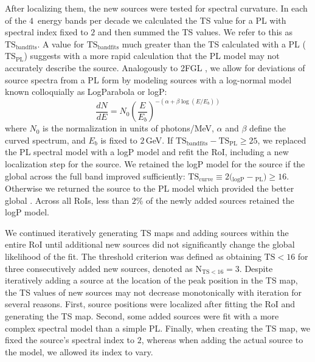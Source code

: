 {After localizing them, the new sources were tested for spectral curvature. In each of the $4$~energy bands per decade we calculated the TS value for a PL with spectral index fixed to $2$ and then summed the TS values. 
We refer to this as $\mathrm{TS_{band fits}}$. A value for $\mathrm{TS_{band fits}}$ much greater than the TS calculated with a PL ($\mathrm{TS_{PL}}$) suggests with a more rapid calculation that the PL model may not accurately describe the source. %
Analogously to 2FGL \citep{2FGL}, we allow for deviations of source spectra from a PL form by modeling sources with a log-normal model known colloquially as LogParabola or logP:
\begin{equation}
	\newcommand{\pfrac}[2]{\left(\frac{#1}{#2}\right)} \frac{dN}{dE} = N_0\pfrac{E}{E_b}^{-(\alpha + \beta\log(E/E_b))}
	\label{eqn:logP}
\end{equation}
where $N_0$ is the normalization in units of photons/MeV, $\alpha$ and $\beta$ define the curved spectrum, and $E_b$ is fixed to $2$\,GeV. If $\mathrm{TS_{band fits} - TS_{PL}} \geq 25$, we replaced the PL spectral model with a logP model and refit the RoI, including a new localization step for the source. We retained the logP model for the source if the global \logL{} across the full band improved sufficiently: 
$\mathrm{TS_{curve}} \equiv 2 ($\logL{}$_{\mathrm{logP}}-$\logL{}$_{\mathrm{PL}}) \geq 16$. 
Otherwise we returned the source to the PL model which provided the better global \logL. Across all RoIs, less than $2\%$ of the newly added sources retained the logP model. 

We continued iteratively generating TS maps and adding sources within the entire RoI until additional new sources did not significantly change the global likelihood of the fit. The threshold criterion was defined as obtaining $\mathrm{TS < 16}$ for three consecutively added new sources, denoted as $\mathrm{N_{TS < 16} = 3}$. Despite iteratively adding a source at the location of the peak position in the TS map, the TS values of new sources may not decrease monotonically with iteration for several reasons. First, source positions were localized after fitting the RoI and generating the TS map. Second, some added sources were fit with a more complex spectral model than a simple PL. Finally, when creating the TS map, we fixed the source's spectral index to $2$, whereas when adding the actual source to the model, we allowed its index to vary. 

}
